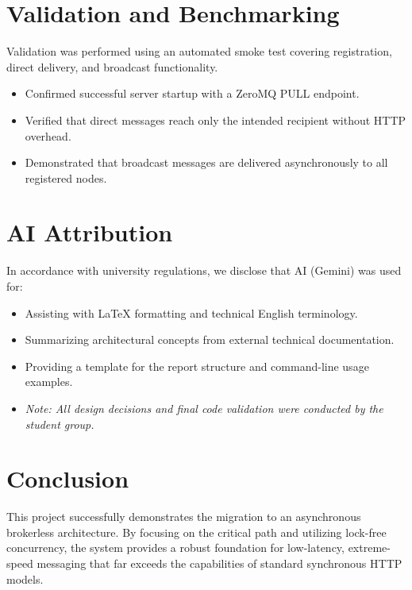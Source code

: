 \documentclass[a4paper,12pt]{article}
\begin{document}
\section{Validation and Benchmarking}
Validation was performed using an automated smoke test covering registration, direct delivery, and broadcast functionality.
\begin{itemize}[leftmargin=1.4em]
  \item Confirmed successful server startup with a ZeroMQ PULL endpoint.
  \item Verified that direct messages reach only the intended recipient without HTTP overhead.
  \item Demonstrated that broadcast messages are delivered asynchronously to all registered nodes.
\end{itemize}

\section{AI Attribution}
In accordance with university regulations, we disclose that AI (Gemini) was used for:
\begin{itemize}
    \item Assisting with LaTeX formatting and technical English terminology.
    \item Summarizing architectural concepts from external technical documentation.
    \item Providing a template for the report structure and command-line usage examples.
    \item \textit{Note: All design decisions and final code validation were conducted by the student group.}
\end{itemize}

\section{Conclusion}
This project successfully demonstrates the migration to an asynchronous brokerless architecture. By focusing on the critical path and utilizing lock-free concurrency, the system provides a robust foundation for low-latency, extreme-speed messaging that far exceeds the capabilities of standard synchronous HTTP models.
\end{document}
